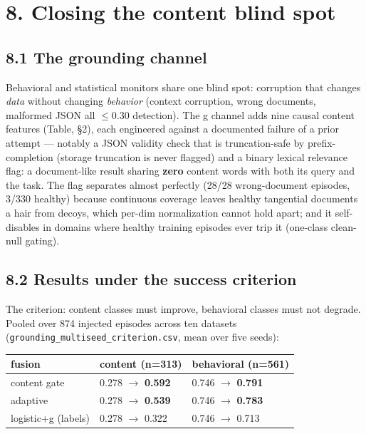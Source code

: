 \documentclass[11pt]{article}
\begin{document}
\section{8. Closing the content blind spot}


\subsection{8.1 The grounding channel}


Behavioral and statistical monitors share one blind spot: corruption that changes \emph{data} without changing \emph{behavior} (context corruption, wrong documents, malformed JSON all $\leq$0.30 detection). The g channel adds nine causal content features (Table, \S{}2), each engineered against a documented failure of a prior attempt --- notably a JSON validity check that is truncation-safe by prefix-completion (storage truncation is never flagged) and a binary lexical relevance flag: a document-like result sharing \textbf{zero} content words with both its query and the task. The flag separates almost perfectly (28/28 wrong-document episodes, 3/330 healthy) because continuous coverage leaves healthy tangential documents a hair from decoys, which per-dim normalization cannot hold apart; and it self-disables in domains where healthy training episodes ever trip it (one-class clean-null gating).


\subsection{8.2 Results under the success criterion}


The criterion: content classes must improve, behavioral classes must not degrade. Pooled over 874 injected episodes across ten datasets (\texttt{grounding\_\allowbreak{}multiseed\_\allowbreak{}criterion.csv}, mean over five seeds):


\begin{longtable}{lll}
\toprule
\textbf{fusion} & \textbf{content (n=313)} & \textbf{behavioral (n=561)} \\
\midrule
\endhead
content gate & 0.278 $\rightarrow$ \textbf{0.592} & 0.746 $\rightarrow$ \textbf{0.791} \\
adaptive & 0.278 $\rightarrow$ \textbf{0.539} & 0.746 $\rightarrow$ \textbf{0.783} \\
logistic+g (labels) & 0.278 $\rightarrow$ 0.322 & 0.746 $\rightarrow$ 0.713 \\
\bottomrule
\end{longtable}
\end{document}
